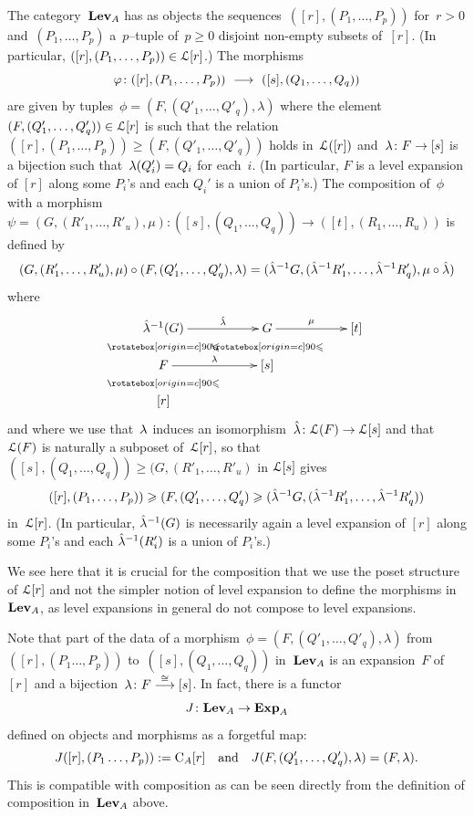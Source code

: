 \begin{definition}
The category~$\mathbf{Lev}_A$ has as objects the sequences~$([r],(P_1,\dots,P_p))$ for~$r>0$ and~$(P_1,\dots,P_p)$ a~$p$--tuple of~$p\geqslant0$ disjoint non-empty subsets of~$[r]$. (In particular, 
$([r],(P_1,\dots,P_p))\in \mathcal{L}[r]$.) 
The morphisms
\[
\varphi\colon([r],(P_1,\dots,P_p)) \ \longrightarrow \  ([s],(Q_1,\dots,Q_q))
\]
are given by tuples~$\phi=(F,(Q'_1,\dots,Q'_q),\lambda)$ where the element $(F,(Q'_{1},\dots,Q'_{q}))\in \mathcal{L}[r]$ is such that the relation~$([r],(P_1,\dots,P_p))\geqslant (F,(Q'_{1},\dots,Q'_{q}))$  holds in~$\mathcal{L}([r])$
and~\hbox{$\lambda\colon F\to [s]$} is a bijection such that~\hbox{$\lambda(Q'_{i})=Q_{i}$} for each~$i$. (In particular, $F$ is a level expansion of $[r]$ along some $P_i$'s and each $Q_i'$ is a union of $P_i$'s.) 
The composition of~$\phi$ with a morphism~\hbox{$\psi=(G,(R'_1,\dots,R'_u),\mu)\colon ([s],(Q_1,\dots,Q_q))\to ([t],(R_1,\dots,R_u))$}  is defined by 
$$(G,(R'_1,\dots,R'_u),\mu) \circ (F,(Q'_1,\dots,Q'_q),\lambda) = (\hat{\lambda}^{-1}G,(\hat{\lambda}^{-1}R'_1,\dots,\hat{\lambda}^{-1}R'_q),\mu\circ\hat\lambda)$$
where 
$$\xymatrix@R-1pc{\hat\la^{-1}(G) \ar[rr]^-{\hat \la} \ar@{}[d]|\IV && G \ar[rr]^-{\mu} \ar@{}[d]|\IV && [t]\\
F \ar[rr]^-{\la} \ar@{}[d]|\IV && [s]&&\\
[r] &&&& 
}$$
and where we use that~$\lambda$ induces an isomorphism~$\hat {\lambda}\colon\mathcal{L}(F)\to \mathcal{L}[s]$ and that~$\mathcal{L}(F)$ is naturally a subposet of~$\mathcal{L}[r]$, so that $ ([s],(Q_1,\dots,Q_q)) \ge (G,(R'_1,\dots,R'_u)$ in $\mathcal{L}[s]$ gives 
\[
([r],(P_1,\dots,P_p))\geqslant  (F,(Q'_1,\dots,Q'_q)\geqslant  (\hat{\lambda}^{-1}G,(\hat{\lambda}^{-1}R'_1,\dots,\hat{\lambda}^{-1}R'_q))
\]
in~$\mathcal{L}[r]$. (In particular, $\hat{\lambda}^{-1}(G)$ is necessarily again a level expansion of $[r]$ along some $P_i$'s and each $\hat{\lambda}^{-1}(R'_i)$ is a union of $P_i$'s.) 
\end{definition}


We see here that it is crucial for the composition that we use the poset structure of $\mathcal{L}[r]$ and not the simpler notion of level expansion to define the morphisms in $\mathbf{Lev}_A$, as level expansions in general do not compose to level expansions. 


Note that part of the data of a morphism~$\phi=(F,(Q'_1,\dots,Q'_q),\lambda)$ from~$([r],(P_1\dots,P_p))$ to~$([s],(Q_1,\dots,Q_q))$ in~$\mathbf{Lev}_A$ is an expansion~$F$ of~$[r]$ and a bijection~$\lambda\colon F\stackrel{\cong}{\longrightarrow} [s]$. In fact, there is a functor
$$J\colon \mathbf{Lev}_A\to \mathbf{Exp}_A$$
defined on objects and morphisms as a forgetful map: 
$$J([r],(P_1\dots,P_p)):=\rmC_A[r] \ \ \ \textrm{and}\ \ \ J(F,(Q'_1,\dots,Q'_q),\lambda)=(F,\la).$$
This is compatible with composition as can be seen directly from the definition of composition in~$\mathbf{Lev}_A$ above. 

